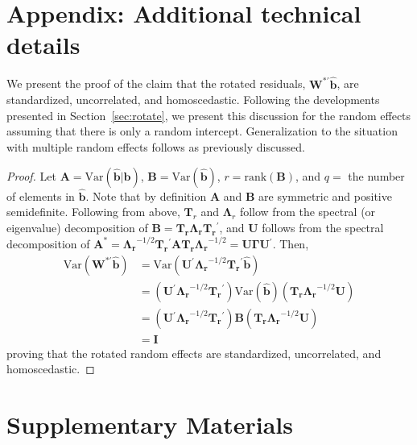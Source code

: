 \documentclass[12pt]{article} %
\newcommand{\trans}{\ensuremath{^\prime}}
\newcommand{\var}{\ensuremath{\mathrm{Var}}}
\begin{document}
\section{Appendix: Additional technical details}

We present the proof of the claim that the rotated residuals, $\bm{W}^{*\prime} \widehat{\bm{b}}$, are standardized, uncorrelated, and homoscedastic. Following the developments presented in Section~\ref{sec:rotate}, we present this discussion for the random effects assuming that there is only a random intercept. Generalization to the situation with multiple random effects follows as previously discussed.

\begin{proof}
 Let $\bm{A} = \var(\widehat{\bm{b}} | \bm{b})$, $\bm{B} = \var(\widehat{\bm{b}})$, $r = \text{rank}(\bm{B})$, and $q = $ the number of elements in $\widehat{\bm{b}}$. Note that by definition $\bm{A}$ and $\bm{B}$ are symmetric and positive semidefinite. Following from above, $\bm{T}_r$ and $\bm{\Lambda}_r$ follow from the spectral (or eigenvalue) decomposition of $\bm{B} = \bm{T_r \Lambda_r T_r}\trans$, and $\bm{U}$ follows from the spectral decomposition of $\bm{A^*} = \bm{\Lambda_r}^{-1/2} \bm{T_r}\trans \bm{A T_r \Lambda_r}^{-1/2} = \bm{U} \bm{\Gamma} \bm{U}\trans$. Then, 
\begin{align*}
\var(\bm{W}^{*\prime} \widehat{\bm{b}}) &= \var(\bm{U}\trans \bm{\Lambda_r}^{-1/2} \bm{T_r}\trans \widehat{\bm{b}})\\
&= (\bm{U}\trans \bm{\Lambda_r}^{-1/2} \bm{T_r}\trans) \var(\widehat{\bm{b}}) (\bm{T_r \Lambda_r}^{-1/2} \bm{U})\\
&= (\bm{U}\trans \bm{\Lambda_r}^{-1/2} \bm{T_r}\trans) \bm{B} (\bm{T_r \Lambda_r}^{-1/2} \bm{U})\\
&= \bm{I}
\end{align*}
proving that the rotated random effects are standardized, uncorrelated, and homoscedastic.
\end{proof}


\section*{Supplementary Materials}
\end{document}
